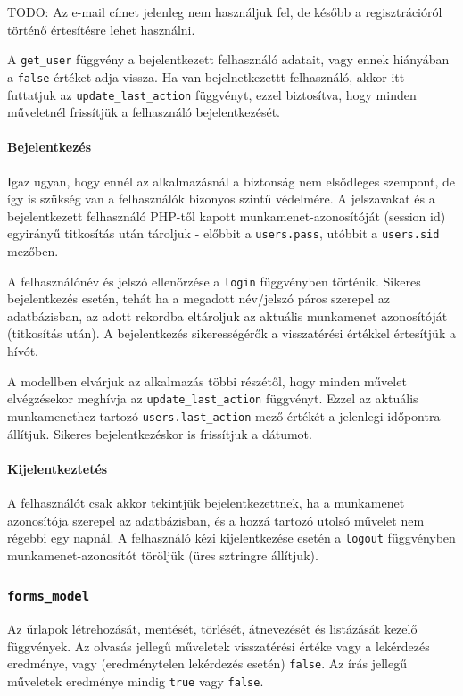 \documentclass[12pt,a4paper,twoside]{article}
\begin{document}
TODO:
Az e-mail címet jelenleg nem használjuk fel, de később a regisztrációról történő
értesítésre lehet használni.

A \texttt{get\_user} függvény a bejelentkezett felhasználó adatait, vagy ennek
hiányában a \texttt{false} értéket adja vissza. Ha van bejelnetkezettt
felhasználó, akkor itt futtatjuk az \texttt{update\_last\_action} függvényt,
ezzel biztosítva, hogy minden műveletnél frissítjük a felhasználó
bejelentkezését.

\paragraph{Bejelentkezés}
Igaz ugyan, hogy ennél az alkalmazásnál a biztonság nem elsődleges szempont, de
így is szükség van a felhasználók bizonyos szintű védelmére. A jelszavakat és
a bejelentkezett felhasználó PHP-től kapott munkamenet-azonosítóját (session
id\cite{PHP-SID}) egyirányű titkosítás után tároljuk - előbbit a
\texttt{users.pass}, utóbbit a \texttt{users.sid} mezőben.

A felhasználónév és jelszó ellenőrzése a \texttt{login} függvényben
történik. Sikeres bejelentkezés esetén, tehát ha a megadott név/jelszó páros
szerepel az adatbázisban, az adott rekordba eltároljuk az aktuális munkamenet
azonosítóját (titkosítás után). A bejelentkezés sikerességérők a visszatérési
értékkel értesítjük a hívót.

A modellben elvárjuk az alkalmazás többi részétől, hogy minden művelet
elvégzésekor meghívja az \texttt{update\_last\_action} függvényt. Ezzel az
aktuális munkamenethez tartozó \texttt{users.last\_action} mező értékét a
jelenlegi időpontra állítjuk. Sikeres bejelentkezéskor is frissítjuk a dátumot.

\paragraph{Kijelentkeztetés}
A felhasználót csak akkor tekintjük bejelentkezettnek, ha a
munkamenet azonosítója szerepel az adatbázisban, és a hozzá tartozó utolsó
művelet nem régebbi egy napnál. A felhasználó kézi kijelentkezése esetén a
\texttt{logout} függvényben munkamenet-azonosítót töröljük (üres sztringre állítjuk).


\subsubsection{\texttt{forms\_model}}

Az űrlapok létrehozását, mentését, törlését, átnevezését és listázását kezelő
függvények. Az olvasás jellegű műveletek visszatérési értéke vagy a lekérdezés
eredménye, vagy (eredménytelen lekérdezés esetén) \texttt{false}. Az írás
jellegű műveletek eredménye mindig \texttt{true} vagy \texttt{false}.
\end{document}
